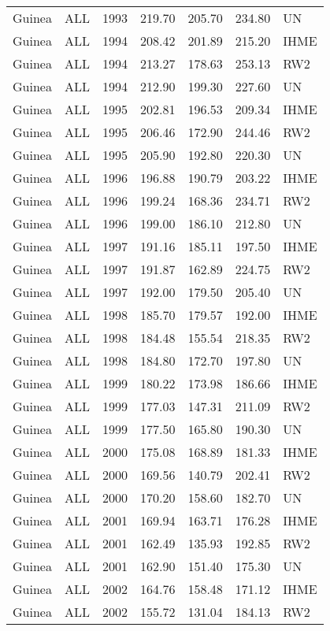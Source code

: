\begin{longtable}{lllrrrl}
  Guinea & ALL & 1993 & 219.70 & 205.70 & 234.80 & UN \\ 
  Guinea & ALL & 1994 & 208.42 & 201.89 & 215.20 & IHME \\ 
  Guinea & ALL & 1994 & 213.27 & 178.63 & 253.13 & RW2 \\ 
  Guinea & ALL & 1994 & 212.90 & 199.30 & 227.60 & UN \\ 
  Guinea & ALL & 1995 & 202.81 & 196.53 & 209.34 & IHME \\ 
  Guinea & ALL & 1995 & 206.46 & 172.90 & 244.46 & RW2 \\ 
  Guinea & ALL & 1995 & 205.90 & 192.80 & 220.30 & UN \\ 
  Guinea & ALL & 1996 & 196.88 & 190.79 & 203.22 & IHME \\ 
  Guinea & ALL & 1996 & 199.24 & 168.36 & 234.71 & RW2 \\ 
  Guinea & ALL & 1996 & 199.00 & 186.10 & 212.80 & UN \\ 
  Guinea & ALL & 1997 & 191.16 & 185.11 & 197.50 & IHME \\ 
  Guinea & ALL & 1997 & 191.87 & 162.89 & 224.75 & RW2 \\ 
  Guinea & ALL & 1997 & 192.00 & 179.50 & 205.40 & UN \\ 
  Guinea & ALL & 1998 & 185.70 & 179.57 & 192.00 & IHME \\ 
  Guinea & ALL & 1998 & 184.48 & 155.54 & 218.35 & RW2 \\ 
  Guinea & ALL & 1998 & 184.80 & 172.70 & 197.80 & UN \\ 
  Guinea & ALL & 1999 & 180.22 & 173.98 & 186.66 & IHME \\ 
  Guinea & ALL & 1999 & 177.03 & 147.31 & 211.09 & RW2 \\ 
  Guinea & ALL & 1999 & 177.50 & 165.80 & 190.30 & UN \\ 
  Guinea & ALL & 2000 & 175.08 & 168.89 & 181.33 & IHME \\ 
  Guinea & ALL & 2000 & 169.56 & 140.79 & 202.41 & RW2 \\ 
  Guinea & ALL & 2000 & 170.20 & 158.60 & 182.70 & UN \\ 
  Guinea & ALL & 2001 & 169.94 & 163.71 & 176.28 & IHME \\ 
  Guinea & ALL & 2001 & 162.49 & 135.93 & 192.85 & RW2 \\ 
  Guinea & ALL & 2001 & 162.90 & 151.40 & 175.30 & UN \\ 
  Guinea & ALL & 2002 & 164.76 & 158.48 & 171.12 & IHME \\ 
  Guinea & ALL & 2002 & 155.72 & 131.04 & 184.13 & RW2 \\ 

\end{longtable}

